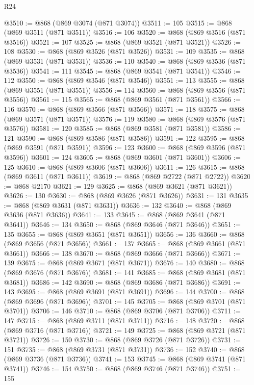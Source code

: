 \begin{lexlean}{R24}
\begin{coremodule}
{{{{{{{{{{{{{{{{{{{{{{{{{{{{{{{{{{{{{{{{{{{{{{{{{{{{{{{{{{{{{{{{{{{{{{{{{{{{{{{{{{{{{{{{{{{{{{{{{{{{{{{{{{{{{{{{{{{{{{{{{{{{{{{{{{{{{{{{{{{{{{{{{{{{{{{{{{{{{{{{{{{{{{{{{{{{{{{{{{{{{{{{{{{{{{{{{{{@3510 := @868 (@869 @3074 (@871 @3074))
@3511 := 105
@3515 := @868 (@869 @3511 (@871 @3511))
@3516 := 106
@3520 := @868 (@869 @3516 (@871 @3516))
@3521 := 107
@3525 := @868 (@869 @3521 (@871 @3521))
@3526 := 108
@3530 := @868 (@869 @3526 (@871 @3526))
@3531 := 109
@3535 := @868 (@869 @3531 (@871 @3531))
@3536 := 110
@3540 := @868 (@869 @3536 (@871 @3536))
@3541 := 111
@3545 := @868 (@869 @3541 (@871 @3541))
@3546 := 112
@3550 := @868 (@869 @3546 (@871 @3546))
@3551 := 113
@3555 := @868 (@869 @3551 (@871 @3551))
@3556 := 114
@3560 := @868 (@869 @3556 (@871 @3556))
@3561 := 115
@3565 := @868 (@869 @3561 (@871 @3561))
@3566 := 116
@3570 := @868 (@869 @3566 (@871 @3566))
@3571 := 118
@3575 := @868 (@869 @3571 (@871 @3571))
@3576 := 119
@3580 := @868 (@869 @3576 (@871 @3576))
@3581 := 120
@3585 := @868 (@869 @3581 (@871 @3581))
@3586 := 121
@3590 := @868 (@869 @3586 (@871 @3586))
@3591 := 122
@3595 := @868 (@869 @3591 (@871 @3591))
@3596 := 123
@3600 := @868 (@869 @3596 (@871 @3596))
@3601 := 124
@3605 := @868 (@869 @3601 (@871 @3601))
@3606 := 125
@3610 := @868 (@869 @3606 (@871 @3606))
@3611 := 126
@3615 := @868 (@869 @3611 (@871 @3611))
@3619 := @868 (@869 @2722 (@871 @2722))
@3620 := @868 @2170
@3621 := 129
@3625 := @868 (@869 @3621 (@871 @3621))
@3626 := 130
@3630 := @868 (@869 @3626 (@871 @3626))
@3631 := 131
@3635 := @868 (@869 @3631 (@871 @3631))
@3636 := 132
@3640 := @868 (@869 @3636 (@871 @3636))
@3641 := 133
@3645 := @868 (@869 @3641 (@871 @3641))
@3646 := 134
@3650 := @868 (@869 @3646 (@871 @3646))
@3651 := 135
@3655 := @868 (@869 @3651 (@871 @3651))
@3656 := 136
@3660 := @868 (@869 @3656 (@871 @3656))
@3661 := 137
@3665 := @868 (@869 @3661 (@871 @3661))
@3666 := 138
@3670 := @868 (@869 @3666 (@871 @3666))
@3671 := 139
@3675 := @868 (@869 @3671 (@871 @3671))
@3676 := 140
@3680 := @868 (@869 @3676 (@871 @3676))
@3681 := 141
@3685 := @868 (@869 @3681 (@871 @3681))
@3686 := 142
@3690 := @868 (@869 @3686 (@871 @3686))
@3691 := 143
@3695 := @868 (@869 @3691 (@871 @3691))
@3696 := 144
@3700 := @868 (@869 @3696 (@871 @3696))
@3701 := 145
@3705 := @868 (@869 @3701 (@871 @3701))
@3706 := 146
@3710 := @868 (@869 @3706 (@871 @3706))
@3711 := 147
@3715 := @868 (@869 @3711 (@871 @3711))
@3716 := 148
@3720 := @868 (@869 @3716 (@871 @3716))
@3721 := 149
@3725 := @868 (@869 @3721 (@871 @3721))
@3726 := 150
@3730 := @868 (@869 @3726 (@871 @3726))
@3731 := 151
@3735 := @868 (@869 @3731 (@871 @3731))
@3736 := 152
@3740 := @868 (@869 @3736 (@871 @3736))
@3741 := 153
@3745 := @868 (@869 @3741 (@871 @3741))
@3746 := 154
@3750 := @868 (@869 @3746 (@871 @3746))
@3751 := 155
}}}}}}}}}}}}}}}}}}}}}}}}}}}}}}}}}}}}}}}}}}}}}}}}}}}}}}}}}}}}}}}}}}}}}}}}}}}}}}}}}}}}}}}}}}}}}}}}}}}}}}}}}}}}}}}}}}}}}}}}}}}}}}}}}}}}}}}}}}}}}}}}}}}}}}}}}}}}}}}}}}}}}}}}}}}}}}}}}}}}}}}}}}}}}}}}}}}
\end{coremodule}
\end{lexlean}
